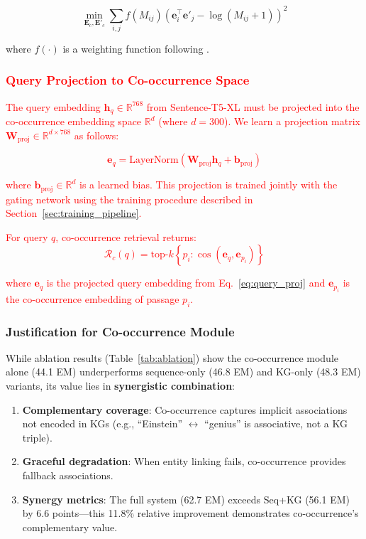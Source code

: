 \documentclass[10pt,twocolumn]{article}
\newcommand{\revisioncritical}[1]{\textcolor{red}{#1}}
\begin{document}
\begin{equation}
\min_{\mathbf{E}_c, \mathbf{E}'_c} \sum_{i,j} f(M_{ij}) \left( \mathbf{e}_i^\top \mathbf{e}'_j - \log(M_{ij} + 1) \right)^2
\end{equation}

where $f(\cdot)$ is a weighting function following \cite{pennington2014glove}.

\revisioncritical{
\subsubsection{Query Projection to Co-occurrence Space}
\label{sec:query_projection}

The query embedding $\mathbf{h}_q \in \mathbb{R}^{768}$ from Sentence-T5-XL must be projected into the co-occurrence embedding space $\mathbb{R}^{d}$ (where $d=300$). We learn a projection matrix $\mathbf{W}_{\text{proj}} \in \mathbb{R}^{d \times 768}$ as follows:

\begin{equation}
\mathbf{e}_q = \text{LayerNorm}(\mathbf{W}_{\text{proj}} \mathbf{h}_q + \mathbf{b}_{\text{proj}})
\label{eq:query_proj}
\end{equation}

where $\mathbf{b}_{\text{proj}} \in \mathbb{R}^d$ is a learned bias. This projection is trained jointly with the gating network using the training procedure described in Section~\ref{sec:training_pipeline}.

For query $q$, co-occurrence retrieval returns:
\begin{equation}
\mathcal{R}_c(q) = \text{top-}k \left\{ p_i : \cos(\mathbf{e}_q, \mathbf{e}_{p_i}) \right\}
\end{equation}

where $\mathbf{e}_q$ is the projected query embedding from Eq.~\ref{eq:query_proj} and $\mathbf{e}_{p_i}$ is the co-occurrence embedding of passage $p_i$.
}


\subsubsection{Justification for Co-occurrence Module}
\label{sec:cooc_justification}

While ablation results (Table~\ref{tab:ablation}) show the co-occurrence module alone (44.1 EM) underperforms sequence-only (46.8 EM) and KG-only (48.3 EM) variants, its value lies in \textbf{synergistic combination}:

\begin{enumerate}
    \item \textbf{Complementary coverage}: Co-occurrence captures implicit associations not encoded in KGs (e.g., ``Einstein'' $\leftrightarrow$ ``genius'' is associative, not a KG triple).
    \item \textbf{Graceful degradation}: When entity linking fails, co-occurrence provides fallback associations.
    \item \textbf{Synergy metrics}: The full system (62.7 EM) exceeds Seq+KG (56.1 EM) by 6.6 points---this 11.8\% relative improvement demonstrates co-occurrence's complementary value.
\end{enumerate}
\end{document}
